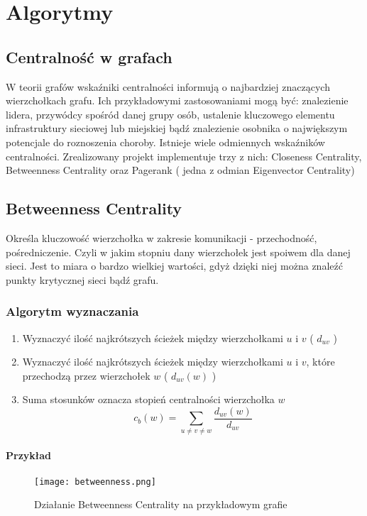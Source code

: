 \chapter{Algorytmy}

\section{Centralność w grafach}

W teorii grafów wskaźniki centralności informują o najbardziej znaczących wierzchołkach grafu. Ich przykładowymi zastosowaniami mogą być: znalezienie lidera, przywódcy spośród danej grupy osób, ustalenie kluczowego elementu infrastruktury sieciowej lub miejskiej bądź znalezienie osobnika o największym potencjale do roznoszenia choroby. Istnieje wiele odmiennych wskaźników centralności. Zrealizowany projekt implementuje trzy z nich: Closeness Centrality, Betweenness Centrality oraz Pagerank ( jedna z odmian Eigenvector Centrality)



\section{Betweenness Centrality}

Określa kluczowość wierzchołka w zakresie komunikacji - przechodność, pośredniczenie. Czyli w jakim stopniu dany wierzchołek jest spoiwem dla danej sieci. Jest to miara o bardzo wielkiej wartości, gdyż dzięki niej można znaleźć punkty krytycznej sieci bądź grafu.

\subsection{Algorytm wyznaczania}
\begin{enumerate}
\item Wyznaczyć ilość najkrótszych ścieżek między wierzchołkami $u$ i $v$ ( $d_{uv}$ )
\item Wyznaczyć ilość najkrótszych ścieżek między wierzchołkami $u$ i $v$, które przechodzą przez wierzchołek $w$ ( $d_{uv}(w)$ )
\item Suma stosunków  oznacza stopień centralności wierzchołka $w$ $$c_b(w) = \sum_{u \neq v \neq w} \frac{d_{uv}(w)}{d_{uv}}$$
\end{enumerate}

\FloatBarrier
\subsubsection{Przykład}
\begin{figure}[h]
\centering
\texttt{[image: betweenness.png]}
\caption{Działanie Betweenness Centrality  na przykładowym grafie}
\end{figure}
\FloatBarrier


